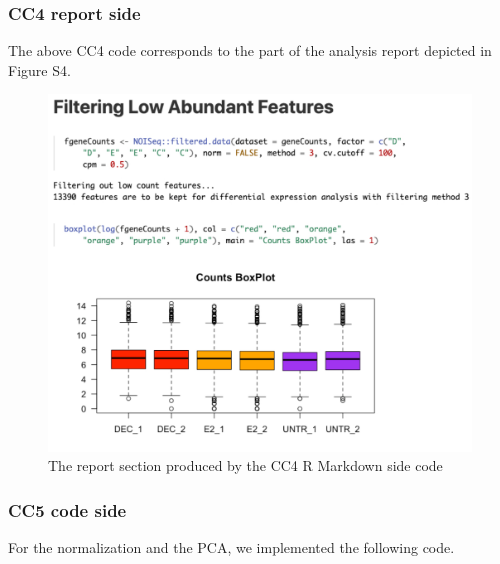 \documentclass[
]{article}
\begin{document}
\hypertarget{cc4-report-side}{%
\subsubsection{CC4 report side}\label{cc4-report-side}}

The above CC4 code corresponds to the part of the analysis report
depicted in Figure S4.

\begin{figure}[ht]

{\centering \includegraphics[width=0.9\linewidth]{imgs/4} 

}

\caption{The report section produced by the CC4 R Markdown side code}\label{fig:unnamed-chunk-10}
\end{figure}

\hypertarget{cc5-code-side}{%
\subsubsection{CC5 code side}\label{cc5-code-side}}

For the normalization and the PCA, we implemented the following code.
\end{document}
